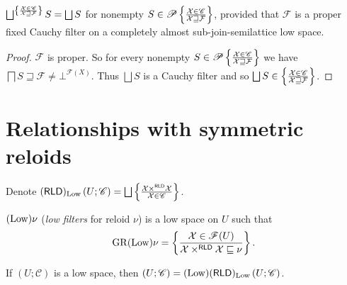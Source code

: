 \begin{prop}
  $\bigsqcup^{
    \setcond{\mathcal{X} \in \mathscr{C} }{\mathcal{X} \sqsupseteq \mathcal{F}}
  } S = \bigsqcup S$ for nonempty
  $S \in \mathscr{P} \left\{ \frac{\mathcal{X} \in \mathscr{C} }{\mathcal{X} \sqsupseteq \mathcal{F}}\right\}$,
  provided that $\mathcal{F}$ is a proper fixed Cauchy filter on a  completely almost sub-join-semilattice low space.
\end{prop}

\begin{proof}
  $\mathcal{F}$ is proper. So for every nonempty $S \in \mathscr{P}
  \left\{ \frac{\mathcal{X} \in \mathscr{C} }{\mathcal{X} \sqsupseteq \mathcal{F}}\right\}$
  we have $\bigsqcap S \sqsupseteq \mathcal{F} \neq \bot^{\mathscr{F} (X)}$. Thus $\bigsqcup S$ is a Cauchy
  filter and so $\bigsqcup S \in \setcond{\mathcal{X} \in \mathscr{C} }{\mathcal{X} \sqsupseteq \mathcal{F}}$.
\end{proof}

\section{Relationships with symmetric reloids}


\begin{defn}
  Denote $(\mathsf{RLD})_{\Low} \left( U ; \mathscr{C} \right) =
  \bigsqcup \setcond{ \mathcal{X} \times^{\mathsf{RLD}} \mathcal{X}}
  {\mathcal{X} \in \mathscr{C} }$.
\end{defn}

\begin{defn}
  $(\operatorname{Low}) \nu$ (\emph{low filters} for reloid $\nu$) is a low
  space on $U$ such that
  \[ \operatorname{GR} (\operatorname{Low}) \nu = \left\{ \frac{\mathcal{X} \in \mathscr{F}(U)}{\mathcal{X} \times^{\mathsf{RLD}} \mathcal{X} \sqsubseteq \nu }\right\} . \]
\end{defn}

\begin{thm}
  If $\left( U ; \mathscr{C} \right)$ is a low space, then $\left( U ;
  \mathscr{C} \right) = (\operatorname{Low}) (\mathsf{RLD})_{\operatorname{Low}} \left(
  U ; \mathscr{C} \right)$.
\end{thm}


